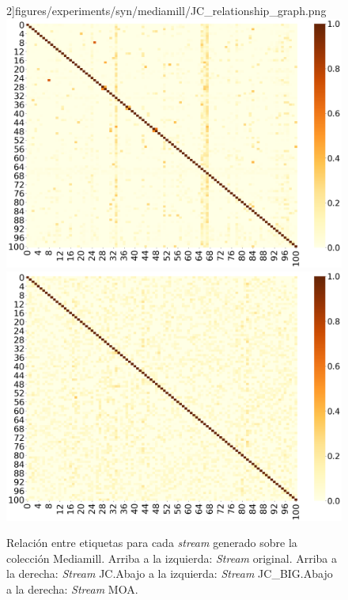 \begin{figure}[htbp]
		2]{figures/experiments/syn/mediamill/JC_relationship_graph.png}
	\includegraphics[width=\linewidth /
		2]{figures/experiments/syn/mediamill/JC_BIG_relationship_graph.png}
	\includegraphics[width=\linewidth /
		2]{figures/experiments/syn/mediamill/MOA_relationship_graph.png}
	\caption[Relación entre etiquetas para cada \textit{stream} generado sobre
		la colección Mediamill.]{Relación entre etiquetas para cada \textit{stream} generado sobre
		la colección Mediamill. Arriba a la izquierda: \textit{Stream} original.
		Arriba a la derecha: \textit{Stream} JC.\@ Abajo a la izquierda:
		\textit{Stream} JC\_BIG.\@ Abajo a la derecha: \textit{Stream} MOA.}
	\label{fig:syn_mediamill_label_relationship}
\end{figure}

